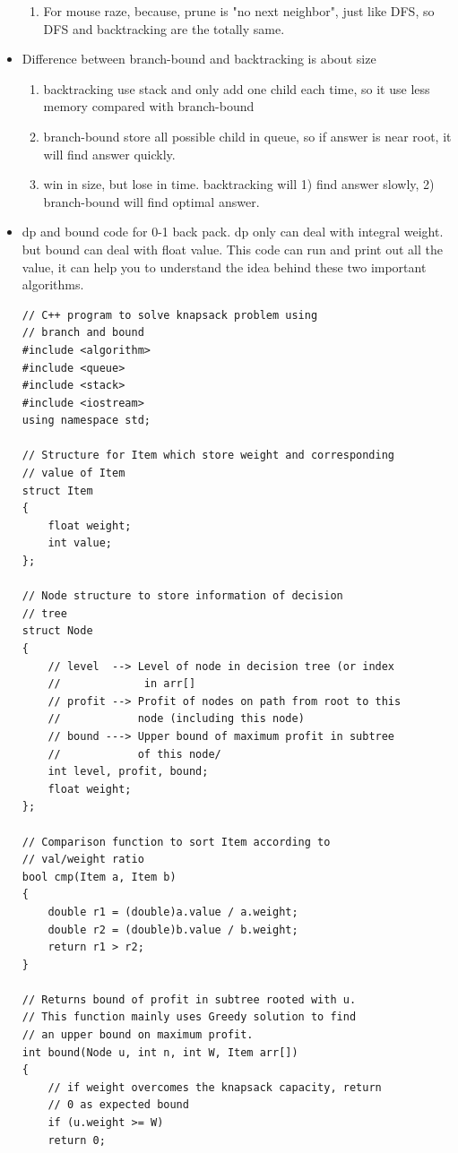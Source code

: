 \documentclass[a4paper,11pt,twoside]{book}
\begin{document}
\begin{itemize}
\begin{enumerate}
\item For mouse raze, because, prune is "no next neighbor", just like DFS, so DFS and backtracking are the totally same.
\end{enumerate}

\item Difference between branch-bound  and backtracking is about size
\begin{enumerate}
\item backtracking use stack and only add one child each time, so it use less memory compared with branch-bound
\item branch-bound store all possible child in queue, so if answer is near root, it will find answer quickly. 

\item win in size, but lose in time. backtracking will 1) find answer slowly, 2) branch-bound will find optimal answer. 
\end{enumerate}

\item dp and bound code for 0-1 back pack.  dp only can deal with integral weight. but bound can deal with float value. This code can run and print out all the value, it can help you to understand the idea behind these two important algorithms. 

\begin{lstlisting}
// C++ program to solve knapsack problem using
// branch and bound
#include <algorithm>
#include <queue>
#include <stack>
#include <iostream>
using namespace std;

// Structure for Item which store weight and corresponding
// value of Item
struct Item
{
	float weight;
	int value;
};

// Node structure to store information of decision
// tree
struct Node
{
	// level  --> Level of node in decision tree (or index
	//             in arr[]
	// profit --> Profit of nodes on path from root to this
	//            node (including this node)
	// bound ---> Upper bound of maximum profit in subtree
	//            of this node/
	int level, profit, bound;
	float weight;
};

// Comparison function to sort Item according to
// val/weight ratio
bool cmp(Item a, Item b)
{
	double r1 = (double)a.value / a.weight;
	double r2 = (double)b.value / b.weight;
	return r1 > r2;
}

// Returns bound of profit in subtree rooted with u.
// This function mainly uses Greedy solution to find
// an upper bound on maximum profit.
int bound(Node u, int n, int W, Item arr[])
{
	// if weight overcomes the knapsack capacity, return
	// 0 as expected bound
	if (u.weight >= W)
	return 0;
	

\end{lstlisting}
\end{itemize}
\end{document}
